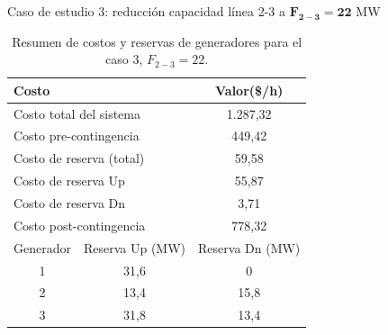 \begin{frame}{Caso  de estudio 3: reducción capacidad línea 2-3 a $\mathbf{F_{2-3}=22}$ MW}
\small
	\begin{table}[H]
		\renewcommand{\arraystretch}{1.3}
		\centering
		\caption{Resumen de costos y reservas de generadores para el caso 3, $F_{2-3}=22$.}
		\label{tab:res_ctos_caso3_22}
		\begin{tabular}{|c|c|c|}
    		\hline
    		\multicolumn{2}{|l|}{Costo} & Valor(\$/h) \\
    		\hline
    		\multicolumn{2}{|l|}{Costo total del sistema} & 1.287,32 \\
    		\multicolumn{2}{|l|}{Costo pre-contingencia} & 449,42 \\
    		\multicolumn{2}{|l|}{Costo de reserva (total)} & 59,58 \\
    		\multicolumn{2}{|l|}{Costo de reserva Up} & 55,87 \\
    		\multicolumn{2}{|l|}{Costo de reserva Dn} & 3,71 \\
    		\multicolumn{2}{|l|}{Costo post-contingencia} & 778,32 \\
    		\hline \hline
    		Generador & Reserva Up (MW) & Reserva Dn (MW) \\
    		\hline
    		1 & 31,6 & 0 \\
    		2 & 13,4 & 15,8 \\
    		3 & 31,8 & 13,4 \\
    		\hline
    	\end{tabular}
	\end{table}

\end{frame}
